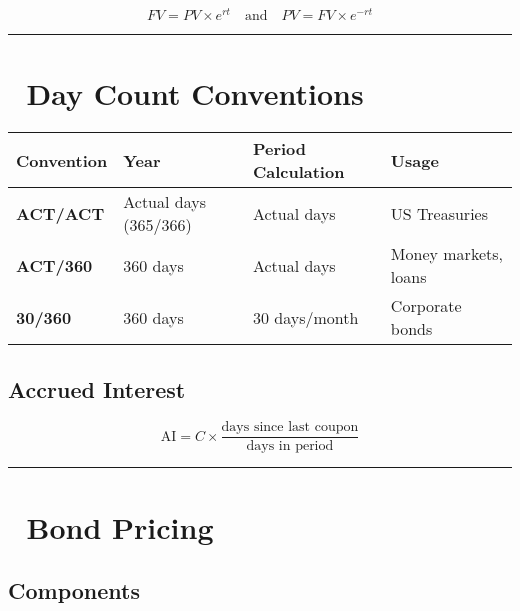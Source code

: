 \documentclass[
  letterpaper,
]{scrbook}
\begin{document}
\[
FV = PV \times e^{rt} \quad \text{and} \quad PV = FV \times e^{-rt}
\]

\begin{center}\rule{0.5\linewidth}{0.5pt}\end{center}

\section*{📅 Day Count Conventions}\label{day-count-conventions-1}


\begin{longtable}[]{@{}llll@{}}
\toprule\noalign{}
Convention & Year & Period Calculation & Usage \\
\midrule\noalign{}
\endhead
\bottomrule\noalign{}
\endlastfoot
\textbf{ACT/ACT} & Actual days (365/366) & Actual days & US
Treasuries \\
\textbf{ACT/360} & 360 days & Actual days & Money markets, loans \\
\textbf{30/360} & 360 days & 30 days/month & Corporate bonds \\
\end{longtable}

\FloatBarrier

\subsection*{Accrued Interest}\label{accrued-interest}

\[
\text{AI} = C \times \frac{\text{days since last coupon}}{\text{days in period}}
\]

\begin{center}\rule{0.5\linewidth}{0.5pt}\end{center}

\section*{🎯 Bond Pricing}\label{bond-pricing}


\subsection*{Components}\label{components}
\end{document}
